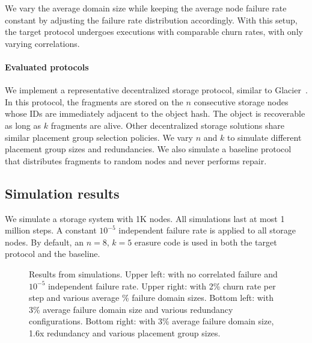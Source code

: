 We vary the average domain size while keeping the average node failure rate constant by adjusting the failure rate distribution accordingly.
With this setup, the target protocol undergoes executions with comparable churn rates, with only varying correlations.

\paragraph{Evaluated protocols}
We implement a representative decentralized storage protocol, similar to Glacier~\cite{glacier}.
In this protocol, the fragments are stored on the $n$ consecutive storage nodes whose IDs are immediately adjacent to the object hash.
The object is recoverable as long as $k$ fragments are alive.
Other decentralized storage solutions share similar placement group selection policies.
We vary $n$ and $k$ to simulate different placement group sizes and redundancies.
We also simulate a baseline protocol that distributes fragments to random nodes and never performs repair.

\subsection{Simulation results}

We simulate a storage system with 1K nodes.
All simulations last at most 1 million steps.
A constant $10^{-5}$ independent failure rate is applied to all storage nodes.
By default, an $n = 8$, $k = 5$ erasure code is used in both the target protocol and the baseline.


\begin{figure}
    \caption{Results from simulations.
    Upper left: with no correlated failure and $10^{-5}$ independent failure rate.
    Upper right: with 2\% churn rate per step and various average \% failure domain sizes.
    Bottom left: with 3\% average failure domain size and various redundancy configurations.
    Bottom right: with 3\% average failure domain size, 1.6x redundancy and various placement group sizes.}
    \label{fig:simulation-all}
\end{figure}


